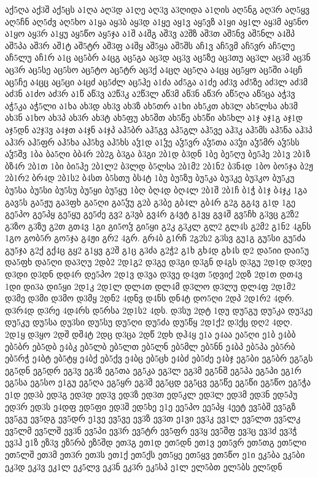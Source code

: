 {აქ5ღა
აქ3შ
აქ5ცს
ა1ღა
აღ3დ
ა1ღე
აღ3ვ
ა3ღიდა
ა1ღის
აღ5ნგ
აღ3რ
აღ5ყვ
აღ5ჩნ
აღ5ძვ
აღ5ხო
ა1ყა
აყ3ბ
აყ3დ
ა1ყე
აყ1ვ
აყ5ვზ
ა1ყი
აყ1ლ
აყ3მ
აყ5ნო
ა1ყო
აყ3რ
ა1ყუ
აყ5წო
აყ5ჯა
ა1შ
ა4შგ
აშ3ვ
ა2შზ
აშ3თ
აშ5ნვ
აშ5ნლ
ა4შპ
აშ5პა
აშ3რ
აშ1ტ
აშ5ტრ
აშ3ფ
ა4შყ
აშ5ყა
აშ5შს
აჩ1ვ
აჩ5ვმ
აჩ5ვრ
აჩ5ლე
აჩ5ლუ
აჩ1რ
ა1ც
აც5ბრ
ა4ცგ
აც5გა
აც3დ
აც3ვ
აც5ზე
აც3თუ
აც3ლ
აც3მ
აც3ნ
აც3რ
აც5სე
აც5სო
აც5ტო
აც5ტრ
აც3ქ
ა4ცღ
აც5ღა
ა4ცყ
აც5ყო
აც5ში
ა4ცჩ
აც5ჩე
ა4ცც
აც5ცი
ა4ცძ
აც5ძლ
აც5ჰე
ა1ძა
აძ5გა
ა1ძე
აძ3ვ
აძ5ზე
აძ3ლ
აძ3მ
აძ3ნ
ა1ძო
აძ3რ
ა1წ
აწ3ვ
ა2წ3კ
ა2წ3ლ
აწ3მ
აწ3ნ
აწ3რ
აწ5ღა
აწ5ცა
აჭ3ვ
აჭ5კა
აჭ5ლი
ა1ხა
ახ3დ
ახ3ვ
ახ3ზ
ახ5თრ
ა1ხი
ახ5კთ
ახ3ლ
ახ5ლსა
ახ3მ
ახ3ნ
ა1ხო
ახ3პ
ახ3რ
ახ3ტ
ახ5ფუ
ახ5შთ
ახ5წე
ახ5წი
ახ5ხლ
ა1ჯ
აჯ1გ
აჯ1დ
აჯ5დნ
ა2ჯ3ვ
ა4ჯთ
ა4ჯნ
ა4ჯპ
აჰ5ბრ
აჰ5გვ
აჰ5გლ
აჰ5ვე
აჰ3კ
აჰ5მს
აჰ5ნა
აჰ3პ
აჰ3რ
აჰ5ფრ
აჰ5ხა
აჰ5ხვ
აჰ5ხს
აჴ1დ
ა1ჴე
აჴ5ვრ
აჴ5თა
ა3ჴი
აჴ5მრ
აჴ5სს
აჴ5შვ
1ბა
ბა5ღი
ბბ4რ
2ბ2გ
ბ3გა
ბ3გი
2ბ1დ
ბ3დნ
1ბე
ბე5ღუ
ბე5ჰე
2ბ1ვ
2ბ1ზ
ბზ4რ
2ბ1თ
1ბი
ბი5ჰე
2ბ1ლ2
ბ3ლდ
ბ5ლსა
2ბ1მ2
2ბ1ნ2
ბ3ნ4დ
1ბო
ბო5ჯა
ბ2ჟ
2ბ1რ2
ბრ4დ
2ბ1ს2
ბ4სთ
ბ5სთუ
ბს4ტ
1ბუ
ბუ5ზუ
ბუ5კა
ბუ3კე
ბუ3კო
ბუ5კუ
ბუ5სა
ბუ5სი
ბუ5სუ
ბუ5ყი
ბუ5ყუ
1ბღ
ბღ4დ
ბღ4ლ
2ბ1შ
2ბ1ჩ
ბ1ჭ
ბ1ჯ
ბ4ჯკ
1გა
გავ5ს
გა5ჟუ
გა3ფხ
გა5ღი
გა5ჴუ
გ2ბ
გ3ბე
გბ4ლ
გბ4რ
გ2გ
გგ4ვ
გ1დ
1გე
გე5პო
გე5პყ
გე5ყუ
გე5ძე
გვ2
გ3ვბ
გვ4რ
გ4ვტ
გ1ვყ
გვ4შ
გვ5ჩხ
გ3ვც
გ2ზ2
გ3ზო
გ3ზუ
გ2თ
გთ4ვ
1გი
გი5ოჴ
გი5ყი
გ2კ
გ3კლ
გლ2
გლ4ს
გ2მ2
გ1ნ2
4გნს
1გო
გობ5რ
გო5ჯა
გ4ჟი
გრ2
4გრ.
გრ4ბ
გ1რჩ
2გ2ს2
გ3სვ
გუ1გ
გუ5სი
გუ5ძა
გუ5ჯა
გ2ქ
გქ4ც
გყ2
გ1ყვ
გ2შ
გ1ც
გ3ძა
გ2ჭ2
გ1ხ
გხ4დ
გხ4ს
დ2
და5იი
დაი5უ
და5ფხ
და5ღი
და3ღუ
2დბ2
2დ1გ2
დ3გე
დ3გი
დ3გნ
დ4გს
დ3გუ
2დ1დ
დ3დე
დ3დი
დ3დნ
დდ4რ
დე5პო
2დ1ვ
დ3ვა
დ3ვე
დ4ვთ
5დვიქ
2დზ
2დ1თ
დთ4ვ
1დი
დი3ა
დი5ყი
2დ1კ
2დ1ლ
დლ4თ
დლ4მ
დ3ლო
დ3ლუ
დლ4ფ
2დ1მ2
დ3მე
დ3მი
დ3მო
დ3მყ
2დნ2
4დნვ
დ4ნს
დნ4ტ
დო5ღი
2დპ
2დ1რ2
4დრ.
დ3რ4დ
დ3რე
4დ4რს
დ5რსა
2დ1ს2
4დს.
დ3სუ
2დტ
1დუ
დუ5გუ
დუ5კა
დუ3კე
დუ5კუ
დუ5სა
დუ3სი
დუ5სუ
დუ5ღი
დუ5ძა
დუ5წყ
2დ1ქ2
დ3ქც
დღ2
4დღ.
2დ1ყ
დ3ყო
2დშ
დშ4ტ
2დც
დ3ცა
2დწ
2დხ
დჰ4ყ
ე1ა
ე4აა
ეა5ღი
ე1ბ
ე4ბბ
ებ5ბრ
ებ5დბ
ე4ბკ
ებ5ლბ
ებ5ლთ
ებ5ლნ
ებ5მლ
ებ5ნნ
ე4ბპ
ებ5პა
ებ5რბ
ებ5რჭ
ე4ბტ
ებ5ტყ
ე4ბქ
ებ5ქვ
ე4ბც
ებ5ცხ
ე4ბძ
ებ5ძე
ე4ბჯ
ეგ5ბი
ეგ5ბრ
ეგ5გს
ეგ5დნ
ეგ5დრ
ეგ3ვ
ეგ3ზ
ეგ5თა
ეგ5კა
ეგ3ლ
ეგ3მ
ეგ5ნშ
ეგ5პა
ეგ5პი
ეგ1რ
ეგ5სა
ეგ5სო
ე1გუ
ეგ5ღა
ეგ5ყრ
ეგ3შ
ეგ5ცდ
ეგ5ცვ
ეგ5წე
ეგ5წი
ეგ5წო
ეგ5ჭა
ე1დ
ედ3ბ
ედ3გ
ედ3დ
ედ3ვ
ედ3ზ
ედ3თ
ედ5კლ
ედ3ლ
ედ3მ
ედ3ნ
ედ5პუ
ედ3რ
ედ3ს
ე4დფ
ედ5ფი
ედ3შ
ედ5ხე
ე1ე
ეე5პო
ეე5პყ
4ეეტ
ევ5ბშ
ევ5გზ
ევ5გუ
ევ5დგ
ევ5დრ
ე1ვე
ევ5ვე
ევ3ზ
ევ3თ
ე1ვი
ევ3კ
ევ1ლ
ევ5ლთ
ევ5ლკ
ევ5ლმ
ევ5ლშ
ევ3ნ
ევ5პი
ევ3რ
ევ5ტრ
ევ5ფრ
ევ3ყ
ევ5შფ
ევ3ც
ევ3ძ
ევ3ჭ
ევ3ჰ
ე1ზ
ეზ3ვ
ეზ5რბ
ეზ5შდ
ეთ3გ
ეთ1დ
ეთ5დნ
ეთ1ვ
ეთ5ვრ
ეთ5თგ
ეთ5ლი
ეთ5ლშ
ეთ3მ
ეთ3რ
ეთ3ს
ეთ1ქ
ეთ5ქს
ეთ5ყე
ეთ5ყვ
ეთ5წო
ე1ი
ეკ5ბა
ეკ5ბი
ეკ3დ
ეკ3ვ
ეკ1ლ
ეკ5ლვ
ეკ3ნ
ეკ3რ
ეკ5სპ
ე1ლ
ელ5ბთ
ელ5ბს
ელ5დნ
}

